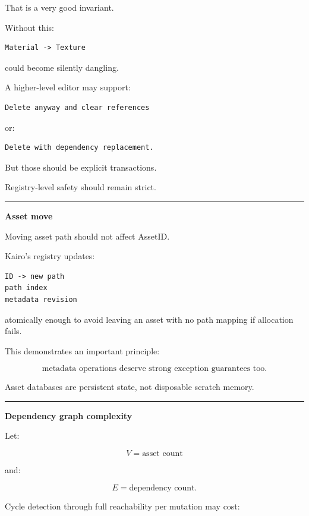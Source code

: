 That is a very good invariant.

Without this:

\begin{verbatim}
Material -> Texture
\end{verbatim}

could become silently dangling.

A higher-level editor may support:

\begin{verbatim}
Delete anyway and clear references
\end{verbatim}

or:

\begin{verbatim}
Delete with dependency replacement.
\end{verbatim}

But those should be explicit transactions.

Registry-level safety should remain strict.

\begin{center}\rule{0.5\linewidth}{0.5pt}\end{center}

\textbf{Asset move}

Moving asset path should not affect AssetID.

Kairo's registry updates:

\begin{verbatim}
ID -> new path
path index
metadata revision
\end{verbatim}

atomically enough to avoid leaving an asset with no path mapping if allocation fails.

This demonstrates an important principle:

\[
\boxed{
\text{metadata operations deserve strong exception guarantees too}.
}
\]

Asset databases are persistent state, not disposable scratch memory.

\begin{center}\rule{0.5\linewidth}{0.5pt}\end{center}

\textbf{Dependency graph complexity}

Let:

\[
V=
\text{asset count}
\]

and:

\[
E=
\text{dependency count}.
\]

Cycle detection through full reachability per mutation may cost:

